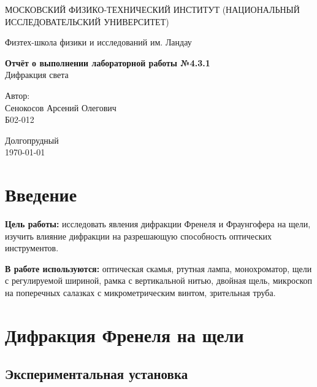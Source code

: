 \documentclass[a4paper,12pt]{article} %
\date{\today}
\begin{document}
\begin{titlepage}
	\begin{center}
		{\large МОСКОВСКИЙ ФИЗИКО-ТЕХНИЧЕСКИЙ ИНСТИТУТ (НАЦИОНАЛЬНЫЙ ИССЛЕДОВАТЕЛЬСКИЙ УНИВЕРСИТЕТ)}
	\end{center}
	\begin{center}
		{\large Физтех-школа физики и исследований им. Ландау}
	\end{center}
	
	
	\vspace{4.5cm}
	{\huge
		\begin{center}
			{\bf Отчёт о выполнении лабораторной работы №4.3.1}\\
			Дифракция света
		\end{center}
	}
	\vspace{2cm}
	\begin{flushright}
		{\LARGE Автор:\\ Сенокосов Арсений Олегович \\
			\vspace{0.2cm}
			Б02-012}
	\end{flushright}
	\vspace{8cm}
	\begin{center}
		Долгопрудный\\
		\today
	\end{center}
\end{titlepage}

\section{Введение}

\textbf{Цель работы:} исследовать явления дифракции Френеля и Фраунгофера на щели, изучить влияние дифракции на разрешающую способность оптических инструментов.

\textbf{В работе используются:} оптическая скамья, ртутная лампа, монохроматор, щели с регулируемой шириной, рамка с вертикальной нитью, двойная щель, микроскоп на поперечных салазках с микрометрическим винтом, зрительная труба.

\section{Дифракция Френеля на щели}

\subsection{Экспериментальная установка}
\end{document}

